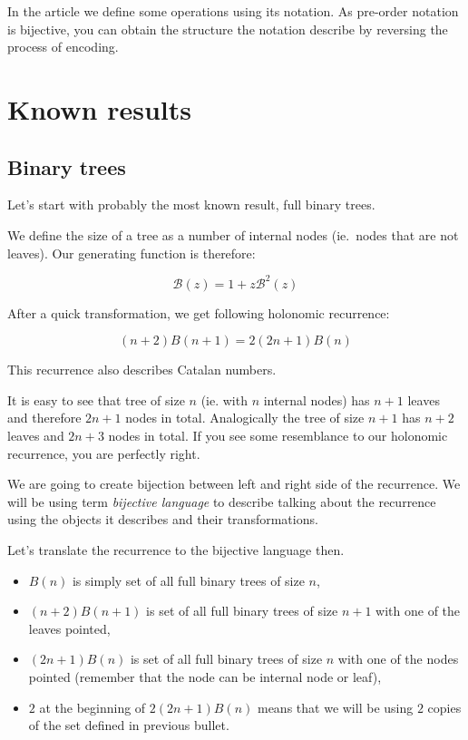 \documentclass[final]{article}
\theoremstyle{definition}
\theoremstyle{remark}
\newcommand{\gf}[1]{\ensuremath{\mathcal{#1}}}
\begin{document}
In the article we define some operations using its notation. As pre-order notation is bijective, you can obtain the structure the notation describe by reversing the process of encoding.

\section{Known results}%
\label{sec:known_results}

\subsection{Binary trees}%
\label{sub:binary_trees}



Let's start with probably the most known result, full binary trees\cite{binary}.

We define the size of a tree as a number of internal nodes (ie.\ nodes that are not leaves). Our generating function is therefore:

\[\gf{B}(z) = 1 + z\gf{B}^2(z)\]

After a quick transformation, we get following holonomic recurrence:

\[(n + 2)B(n + 1) = 2 (2n + 1)B(n)\]

This recurrence also describes Catalan numbers.

It is easy to see that tree of size \(n\) (ie. with \(n\) internal nodes) has \(n + 1\) leaves and therefore \(2n + 1\) nodes in total. Analogically the tree of size \(n + 1\) has \(n + 2\) leaves and \(2n + 3\) nodes in total. If you see some resemblance to our holonomic recurrence, you are perfectly right.

We are going to create bijection between left and right side of the recurrence. We will be using term \textit{bijective language} to describe talking about the recurrence using the objects it describes and their transformations.

Let's translate the recurrence to the bijective language then.
\begin{itemize}
    \item \(B(n)\) is simply set of all full binary trees of size \(n\),
    \item \((n + 2) B(n + 1)\) is set of all full binary trees of size \(n + 1\) with one of the leaves pointed,
    \item \((2n + 1) B(n)\) is set of all full binary trees of size \(n\) with one of the nodes pointed (remember that the node can be internal node or leaf),
    \item \(2\) at the beginning of \(2 (2n + 1) B(n)\) means that we will be using \(2\) copies of the set defined in previous bullet.
\end{itemize}
\end{document}
